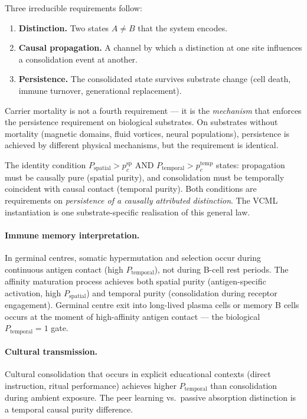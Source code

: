 \documentclass[11pt,a4paper]{article}
\newcommand{\Psp}{P_{\mathrm{spatial}}}
\newcommand{\Ptemp}{P_{\mathrm{temporal}}}
\begin{document}
Three irreducible requirements follow:
\begin{enumerate}
  \item \textbf{Distinction.} Two states $A \neq B$ that the system encodes.
  \item \textbf{Causal propagation.} A channel by which a distinction at one site
    influences a consolidation event at another.
  \item \textbf{Persistence.} The consolidated state survives substrate change
    (cell death, immune turnover, generational replacement).
\end{enumerate}
Carrier mortality is not a fourth requirement --- it is the \emph{mechanism} that
enforces the persistence requirement on biological substrates.
On substrates without mortality (magnetic domains, fluid vortices, neural populations),
persistence is achieved by different physical mechanisms, but the requirement is identical.

The identity condition $\Psp > p_c^\mathrm{sp}$ AND $\Ptemp > p_c^\mathrm{temp}$ states:
propagation must be causally pure (spatial purity), and consolidation must be
temporally coincident with causal contact (temporal purity).
Both conditions are requirements on \emph{persistence of a causally attributed distinction}.
The VCML instantiation is one substrate-specific realisation of this general law.

\paragraph{Immune memory interpretation.}
In germinal centres, somatic hypermutation and selection occur during continuous antigen
contact (high $\Ptemp$), not during B-cell rest periods.
The affinity maturation process achieves both spatial purity (antigen-specific activation,
high $\Psp$) and temporal purity (consolidation during receptor engagement).
Germinal centre exit into long-lived plasma cells or memory B cells occurs at the moment
of high-affinity antigen contact --- the biological $\Ptemp = 1$ gate.

\paragraph{Cultural transmission.}
Cultural consolidation that occurs in explicit educational contexts (direct instruction,
ritual performance) achieves higher $\Ptemp$ than consolidation during ambient exposure.
The peer learning vs.\ passive absorption distinction is a temporal causal purity difference.
\end{document}
